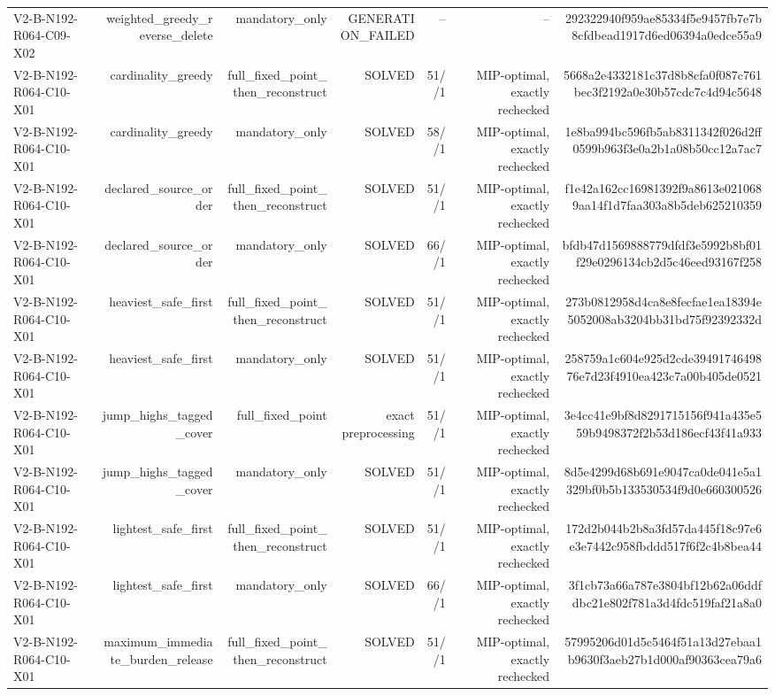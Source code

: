 {\begin{longtable}{lrrrrrr}
V2-B-N192-R064-C09-X02 & weighted\_greedy\_reverse\_delete & mandatory\_only & GENERATION\_FAILED & -- & -- & 292322940f959ae85334f5e9457fb7e7b8cfdbead1917d6ed06394a0edce55a9 \\
V2-B-N192-R064-C10-X01 & cardinality\_greedy & full\_fixed\_point\_then\_reconstruct & SOLVED & 51//1 & MIP-optimal, exactly rechecked & 5668a2e4332181c37d8b8cfa0f087c761bec3f2192a0e30b57cdc7c4d94c5648 \\
V2-B-N192-R064-C10-X01 & cardinality\_greedy & mandatory\_only & SOLVED & 58//1 & MIP-optimal, exactly rechecked & 1e8ba994bc596fb5ab8311342f026d2ff0599b963f3e0a2b1a08b50cc12a7ac7 \\
V2-B-N192-R064-C10-X01 & declared\_source\_order & full\_fixed\_point\_then\_reconstruct & SOLVED & 51//1 & MIP-optimal, exactly rechecked & f1e42a162cc16981392f9a8613e0210689aa14f1d7faa303a8b5deb625210359 \\
V2-B-N192-R064-C10-X01 & declared\_source\_order & mandatory\_only & SOLVED & 66//1 & MIP-optimal, exactly rechecked & bfdb47d1569888779dfdf3e5992b8bf01f29e0296134cb2d5c46eed93167f258 \\
V2-B-N192-R064-C10-X01 & heaviest\_safe\_first & full\_fixed\_point\_then\_reconstruct & SOLVED & 51//1 & MIP-optimal, exactly rechecked & 273b0812958d4ca8e8fecfae1ea18394e5052008ab3204bb31bd75f92392332d \\
V2-B-N192-R064-C10-X01 & heaviest\_safe\_first & mandatory\_only & SOLVED & 51//1 & MIP-optimal, exactly rechecked & 258759a1c604e925d2cde3949174649876e7d23f4910ea423c7a00b405de0521 \\
V2-B-N192-R064-C10-X01 & jump\_highs\_tagged\_cover & full\_fixed\_point & exact preprocessing & 51//1 & MIP-optimal, exactly rechecked & 3e4cc41e9bf8d8291715156f941a435e559b9498372f2b53d186ecf43f41a933 \\
V2-B-N192-R064-C10-X01 & jump\_highs\_tagged\_cover & mandatory\_only & SOLVED & 51//1 & MIP-optimal, exactly rechecked & 8d5e4299d68b691e9047ca0de041e5a1329bf0b5b133530534f9d0e660300526 \\
V2-B-N192-R064-C10-X01 & lightest\_safe\_first & full\_fixed\_point\_then\_reconstruct & SOLVED & 51//1 & MIP-optimal, exactly rechecked & 172d2b044b2b8a3fd57da445f18c97e6e3e7442c958fbddd517f6f2c4b8bea44 \\
V2-B-N192-R064-C10-X01 & lightest\_safe\_first & mandatory\_only & SOLVED & 66//1 & MIP-optimal, exactly rechecked & 3f1cb73a66a787e3804bf12b62a06ddfdbc21e802f781a3d4fdc519faf21a8a0 \\
V2-B-N192-R064-C10-X01 & maximum\_immediate\_burden\_release & full\_fixed\_point\_then\_reconstruct & SOLVED & 51//1 & MIP-optimal, exactly rechecked & 57995206d01d5c5464f51a13d27ebaa1b9630f3aeb27b1d000af90363cea79a6 \\

\end{longtable}}
